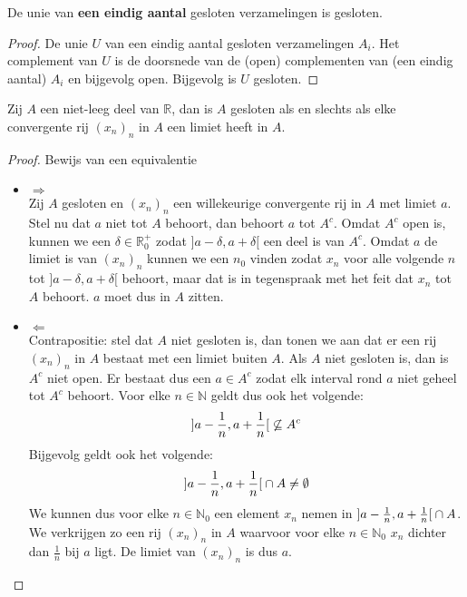 \documentclass[main.tex]{subfiles}
\begin{document}
\begin{pr}
  De unie van \textbf{een eindig aantal} gesloten verzamelingen is gesloten.

  \begin{proof}
    De unie $U$ van een eindig aantal gesloten verzamelingen $A_{i}$.
    Het complement van $U$ is de doorsnede van de (open) complementen van (een eindig aantal) $A_{i}$ en bijgevolg open.
    Bijgevolg is $U$ gesloten.
  \end{proof}
\end{pr}

\begin{pr}
  \label{pr:gesloten-asa-elke-convergente-rij-in-A-limiet-in-A}
  Zij $A$ een niet-leeg deel van $\mathbb{R}$, dan is $A$ gesloten als en slechts als elke convergente rij $(x_{n})_{n}$ in $A$ een limiet heeft in $A$.

  \begin{proof}
    Bewijs van een equivalentie\\
    \begin{itemize}
    \item $\Rightarrow$\\
      Zij $A$ gesloten en $(x_{n})_{n}$ een willekeurige convergente rij in $A$ met limiet $a$.
      Stel nu dat $a$ niet tot $A$ behoort, dan behoort $a$ tot $A^{c}$.
      Omdat $A^{c}$ open is, kunnen we een $\delta \in \mathbb{R}_{0}^{+}$ zodat $]a-\delta,a+\delta[$ een deel is van $A^{c}$.
      Omdat $a$ de limiet is van $(x_{n})_{n}$ kunnen we een $n_{0}$ vinden zodat $x_{n}$ voor alle volgende $n$ tot $]a-\delta,a+\delta[$ behoort, maar dat is in tegenspraak met het feit dat $x_{n}$ tot $A$ behoort.
      $a$ moet dus in $A$ zitten.
    \item $\Leftarrow$\\
      Contrapositie: stel dat $A$ niet gesloten is, dan tonen we aan dat er een rij $(x_{n})_{n}$ in $A$ bestaat met een limiet buiten $A$.
      Als $A$ niet gesloten is, dan is $A^{c}$ niet open.
      Er bestaat dus een $a\in A^{c}$ zodat elk interval rond $a$ niet geheel tot $A^{c}$ behoort.
      Voor elke $n \in \mathbb{N}$ geldt dus ook het volgende:
      \[ \interval[open]{a-\frac{1}{n}}{a+\frac{1}{n}} \not \subseteq A^{c} \]
      Bijgevolg geldt ook het volgende:
      \[ \interval[open]{a-\frac{1}{n}}{a+\frac{1}{n}} \cap A \neq \emptyset \]
      We kunnen dus voor elke $n\in \mathbb{N}_{0}$ een element $x_{n}$ nemen in $\interval[open]{a-\frac{1}{n}}{a+\frac{1}{n}} \cap A$.
      We verkrijgen zo een rij $(x_{n})_{n}$ in $A$ waarvoor voor elke $n\in \mathbb{N}_{0}$ $x_{n}$ dichter dan $\frac{1}{n}$ bij $a$ ligt.
      De limiet van $(x_{n})_{n}$ is dus $a$.
    \end{itemize}
  \end{proof}
\end{pr}
\end{document}
